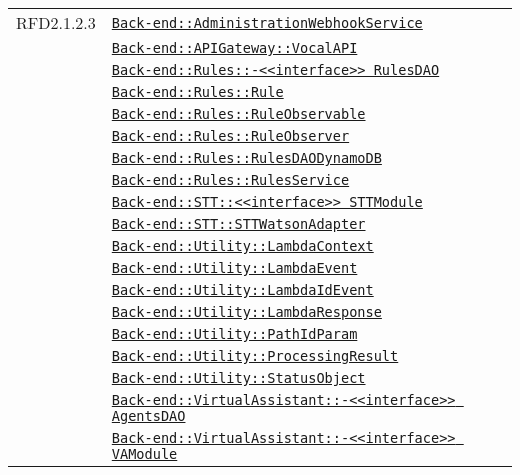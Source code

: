 \begin{longtable}{|>{\centering}m{3cm}|m{10cm}<{\centering}|}
RFD2.1.2.3 & \hyperref[Back-end::AdministrationWebhookService]{\texttt{Back-end::AdministrationWebhookService}}\\
& \hyperref[Back-end::APIGateway::VocalAPI]{\texttt{Back-end::APIGateway::VocalAPI}}\\
& \hyperref[Back-end::Rules::<<interface>> RulesDAO]{\texttt{Back-end::Rules::-\linebreak <<interface>> RulesDAO}}\\
& \hyperref[Back-end::Rules::Rule]{\texttt{Back-end::Rules::Rule}}\\
& \hyperref[Back-end::Rules::RuleObservable]{\texttt{Back-end::Rules::RuleObservable}}\\
& \hyperref[Back-end::Rules::RuleObserver]{\texttt{Back-end::Rules::RuleObserver}}\\
& \hyperref[Back-end::Rules::RulesDAODynamoDB]{\texttt{Back-end::Rules::RulesDAODynamoDB}}\\
& \hyperref[Back-end::Rules::RulesService]{\texttt{Back-end::Rules::RulesService}}\\
& \hyperref[Back-end::STT::<<interface>> STTModule]{\texttt{Back-end::STT::<<interface>> STTModule}}\\
& \hyperref[Back-end::STT::STTWatsonAdapter]{\texttt{Back-end::STT::STTWatsonAdapter}}\\
& \hyperref[Back-end::Utility::LambdaContext]{\texttt{Back-end::Utility::LambdaContext}}\\
& \hyperref[Back-end::Utility::LambdaEvent]{\texttt{Back-end::Utility::LambdaEvent}}\\
& \hyperref[Back-end::Utility::LambdaIdEvent]{\texttt{Back-end::Utility::LambdaIdEvent}}\\
& \hyperref[Back-end::Utility::LambdaResponse]{\texttt{Back-end::Utility::LambdaResponse}}\\
& \hyperref[Back-end::Utility::PathIdParam]{\texttt{Back-end::Utility::PathIdParam}}\\
& \hyperref[Back-end::Utility::ProcessingResult]{\texttt{Back-end::Utility::ProcessingResult}}\\
& \hyperref[Back-end::Utility::StatusObject]{\texttt{Back-end::Utility::StatusObject}}\\
& \hyperref[Back-end::VirtualAssistant::<<interface>> AgentsDAO]{\texttt{Back-end::VirtualAssistant::-\linebreak <<interface>> AgentsDAO}}\\
& \hyperref[Back-end::VirtualAssistant::<<interface>> VAModule]{\texttt{Back-end::VirtualAssistant::-\linebreak <<interface>> VAModule}}\\

\end{longtable}
